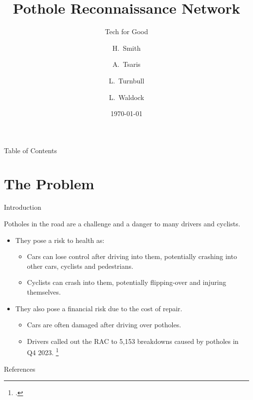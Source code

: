 \documentclass{beamer}
\title{Pothole Reconnaissance Network}
\subtitle{Tech for Good}
\author[Smith, Tsaris, Turnbull, Waldock]{H.~Smith \and A.~Tsaris \and L.~Turnbull \and L.~Waldock}
\institute[5J]{Group 5J}
\date{\today}
\begin{document}
\frame{\titlepage}

\begin{frame}{Table of Contents}
    \tableofcontents
\end{frame}

\section{The Problem}

\begin{frame}{Introduction}

Potholes in the road are a challenge and a danger to many drivers and cyclists.

\begin{itemize}
    \item They pose a risk to \alert{health} as:
    \begin{itemize}
        \item Cars can lose control after driving into them, potentially crashing into other cars, cyclists and pedestrians.
        \item Cyclists can crash into them, potentially flipping-over and injuring themselves.
    \end{itemize}
    \item{They also pose a \alert{financial} risk due to the cost of repair.}
    \begin{itemize}
        \item Cars are often damaged after driving over potholes.
        \item Drivers called out the RAC to 5,153 breakdowns caused by potholes in Q4 2023. \footcite{car-breakdowns}
    \end{itemize}
\end{itemize}

\end{frame}

\begin{frame}{References}
    \printbibliography
\end{frame}
\end{document}
